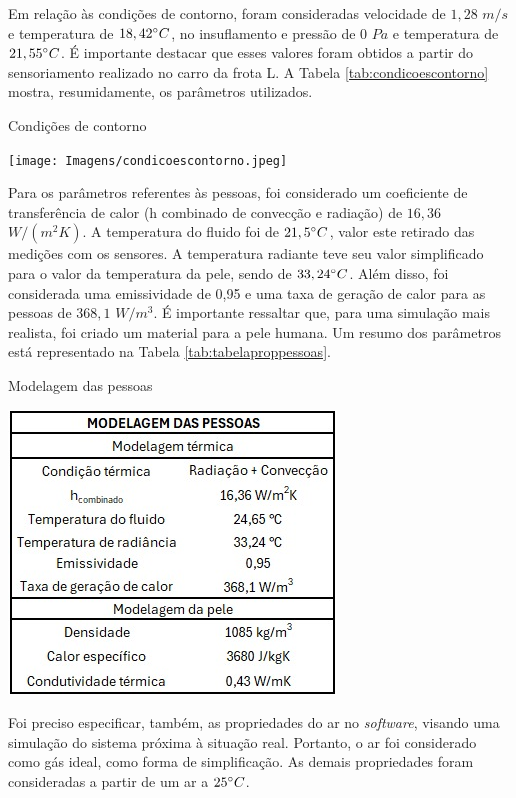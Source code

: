 \documentclass[acronym,symbols,table]{fei}
\begin{document}
Em relação às condições de contorno, foram consideradas velocidade de $1,28$ $m/s$ e temperatura de $18,42\space ^\circ C$, no insuflamento e pressão de $0$ $Pa$ e temperatura de $21,55\space^\circ C$. É importante destacar que esses valores foram obtidos a partir do sensoriamento realizado no carro da frota L. A Tabela \ref{tab:condicoescontorno} mostra, resumidamente, os parâmetros utilizados. 

\begin{table}[!htb]
    \centering
    \caption{Condições de contorno}
    \texttt{[image: Imagens/condicoescontorno.jpeg]}
    \label{tab:condicoescontorno}
\end{table}

Para os parâmetros referentes às pessoas, foi considerado um coeficiente de transferência de calor (h combinado de convecção e radiação) de $16,36$ $W/(m^2K)$. A temperatura do fluido foi de $21,5\space^\circ C$, valor este retirado das medições com os sensores. A temperatura radiante teve seu valor simplificado para o valor da temperatura da pele, sendo de $33,24 \space^\circ C$. Além disso, foi considerada uma emissividade de 0,95 e uma taxa de geração de calor para as pessoas de $368,1$ $W/m^3$. É importante ressaltar que, para uma simulação mais realista, foi criado um material para a pele humana. Um resumo dos parâmetros está representado na Tabela \ref{tab:tabelaproppessoas}.

\begin{table}[!htb]
    \centering
    \caption{Modelagem das pessoas}
    \includegraphics[width=0.4\linewidth]{Tabelas/tabelaproppessoas.jpeg}
    \label{tab:tabelaproppessoas}
\end{table}

\newpage

Foi preciso especificar, também, as propriedades do ar no \textit{software}, visando uma simulação do sistema próxima à situação real. Portanto, o ar foi considerado como gás ideal, como forma de simplificação. As demais propriedades foram consideradas a partir de um ar a $25\space^\circ C$.
\end{document}
